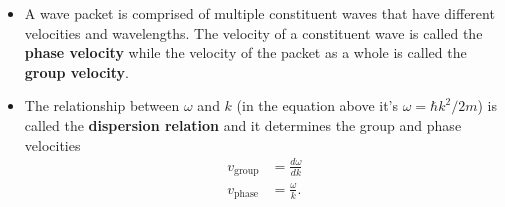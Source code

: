 \documentclass{article}
\begin{document}
\begin{itemize}
  \item A wave packet is comprised of multiple constituent waves that have different velocities and wavelengths. The velocity of a constituent wave is called the \textbf{phase velocity} while the velocity of the packet as a whole is called the \textbf{group velocity}.

  \item The relationship between $\omega$ and $k$ (in the equation above it's $\omega = \hbar k^2 / 2 m$) is called the \textbf{dispersion relation} and it determines the group and phase velocities \begin{align*}
          v_\text{group} & = \frac{d \omega}{d k} \\
          v_\text{phase} & = \frac{\omega}{k}.
        \end{align*}
\end{itemize}
\end{document}
